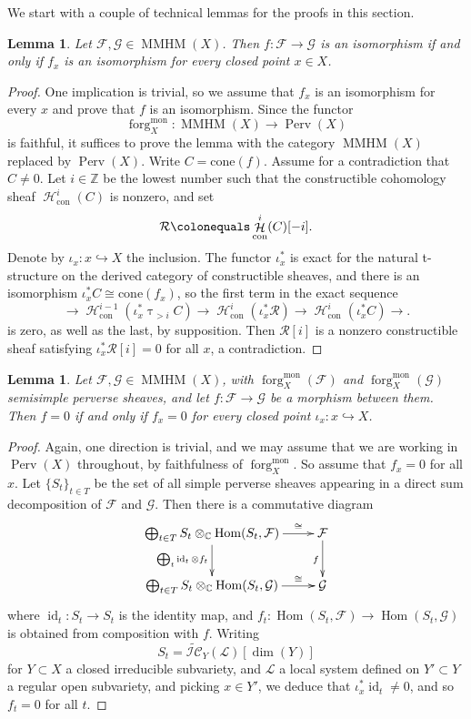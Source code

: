\documentclass[a4paper,10pt]{amsart}
\renewcommand{\tau}{\uptau}
\newtheorem{lemma}[theorem]{Lemma}
\newcommand{\ICSn}{\tilde{\mathcal{IC}}}
\DeclareMathOperator{\Hom}{Hom}
\DeclareMathOperator{\mon}{mon}
\DeclareMathOperator{\MMHM}{MMHM}
\DeclareMathOperator{\perv}{Perv}
\DeclareMathOperator{\id}{id}
\DeclareMathOperator{\forg}{forg}
\newcommand{\form}[1]{\forg^{\mon}_{#1}}
\DeclareMathOperator{\Ho}{\mathcal{H}}
\begin{document}
We start with a couple of technical lemmas for the proofs in this section.
\begin{lemma}
\label{Tech1}
Let $\mathcal{F},\mathcal{G}\in\MMHM(X)$.  Then $f\colon \mathcal{F}\rightarrow \mathcal{G}$ is an isomorphism if and only if $f_x$ is an isomorphism for every closed point $x\in X$.
\end{lemma}
\begin{proof}
One implication is trivial, so we assume that $f_x$ is an isomorphism for every $x$ and prove that $f$ is an isomorphism.  Since the functor 
\[
\form{X}\colon \MMHM(X)\rightarrow \perv(X)
\]
is faithful, it suffices to prove the lemma with the category $\MMHM(X)$ replaced by $\perv(X)$.  Write $C=\textrm{cone}(f)$.  Assume for a contradiction that $C\neq 0$.  Let $i\in\mathbb{Z}$ be the lowest number such that the constructible cohomology sheaf $\Ho_{\textrm{con}}^i(C)$ is nonzero, and set 
\[
\mathcal{R}\colonequals \Ho_{\textrm{con}}^i(C)[-i].  
\]
Denote by $\iota_x\colon x\hookrightarrow X$ the inclusion.  The functor $\iota^*_x$ is exact for the natural t-structure on the derived category of constructible sheaves, and there is an isomorphism $\iota_x^*C\cong \textrm{cone}(f_x)$, so the first term in the exact sequence
\[
\rightarrow \Ho^{i-1}_{\textrm{con}}(\iota_x^*\tau_{>i}C)\rightarrow \Ho^i_{\textrm{con}}(\iota_x^*\mathcal{R})\rightarrow \Ho^i_{\textrm{con}}(\iota^*_xC)\rightarrow.
\]
is zero, as well as the last, by supposition.  Then $\mathcal{R}[i]$ is a nonzero constructible sheaf satisfying $\iota^*_x\mathcal{R}[i]=0$ for all $x$, a contradiction.
\end{proof}
\begin{lemma}
\label{Tech2}
Let $\mathcal{F},\mathcal{G}\in\MMHM(X)$, with $\form{X}(\mathcal{F})$ and $\form{X}(\mathcal{G})$ semisimple perverse sheaves, and let $f\colon \mathcal{F}\rightarrow\mathcal{G}$ be a morphism between them.  Then $f=0$ if and only if $f_x=0$ for every closed point $\iota_x\colon x\hookrightarrow X$.
\end{lemma}
\begin{proof}
Again, one direction is trivial, and we may assume that we are working in $\perv(X)$ throughout, by faithfulness of $\form{X}$.  So assume that $f_x=0$ for all $x$.  Let $\{S_t\}_{t\in T}$ be the set of all simple perverse sheaves appearing in a direct sum decomposition of $\mathcal{F}$ and $\mathcal{G}$.  Then there is a commutative diagram
\[
\xymatrix{
\bigoplus_{t\in T} S_t\otimes_{\mathbb{C}}\Hom(S_t,\mathcal{F})\ar[r]^-{\cong}\ar[d]_{\bigoplus_t \id_t\otimes f_t}&\mathcal{F}\ar[d]_f\\
\bigoplus_{t\in T} S_t\otimes_{\mathbb{C}}\Hom(S_t,\mathcal{G})\ar[r]^-{\cong}& \mathcal{G}
}
\]
where $\id_t\colon S_t\rightarrow S_t$ is the identity map, and $f_t\colon \Hom(S_t,\mathcal{F})\rightarrow \Hom(S_t,\mathcal{G})$ is obtained from composition with $f$.  Writing
\[
S_t=\ICSn_{Y}(\mathcal{L})[\dim(Y)]
\]
for $Y\subset X$ a closed irreducible subvariety, and $\mathcal{L}$ a local system defined on $Y'\subset Y$ a regular open subvariety, and picking $x\in Y'$, we deduce that $\iota_x^*\id_t\neq 0$, and so $f_t=0$ for all $t$.
\end{proof}
\end{document}
